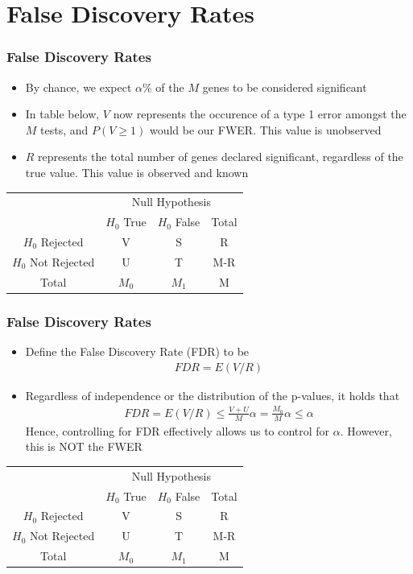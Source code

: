 \documentclass[11pt]{beamer}
\begin{document}
\section{False Discovery Rates}

\begin{frame}
\frametitle{False Discovery Rates}
{
\begin{itemize}
\item By chance, we expect $\alpha \%$ of the $M$ genes to be considered significant \\
\item In table below, $V$ now represents the occurence of a type 1 error amongst the $M$ tests, and $P(V \geq 1)$ would be our FWER. This value is unobserved
\item $R$ represents the total number of genes declared significant, regardless of the true value. This value is observed and known
\end{itemize}

\begin{center}
\begin{tabular}{c| c c c}
\hline
& \multicolumn{3}{c}{Null Hypothesis} \\[3pt]
& $H_0$ True & $H_0$ False & Total\\
\hline 
$H_0$ Rejected & V & S & R \\[2pt]
$H_0$ Not Rejected & U & T  & M-R \\[1pt]
\hline
Total & $M_0$& $M_1$& M\\
\hline
\end{tabular}
\end{center}
}
\end{frame}

\begin{frame}
\frametitle{False Discovery Rates}
{
\begin{itemize}
\item Define the False Discovery Rate (FDR) to be 
\begin{align*}
FDR = E(V/R)
\end{align*}
\item Regardless of independence or the distribution of the p-values, it holds that
\begin{align*}
FDR = E(V/R) \leq \frac{V+U}{M} \alpha = \frac{M_0}{M} \alpha \leq \alpha
\end{align*}
Hence, controlling for FDR effectively allows us to control for $\alpha$. However, this is NOT the FWER
\end{itemize}
\begin{center}
\begin{tabular}{c| c c c}
\hline
& \multicolumn{3}{c}{Null Hypothesis} \\[3pt]
& $H_0$ True & $H_0$ False & Total\\
\hline 
$H_0$ Rejected & V & S & R \\[2pt]
$H_0$ Not Rejected & U & T  & M-R \\[1pt]
\hline
Total & $M_0$& $M_1$& M\\
\hline
\end{tabular}
\end{center}
}
\end{frame}
\end{document}
